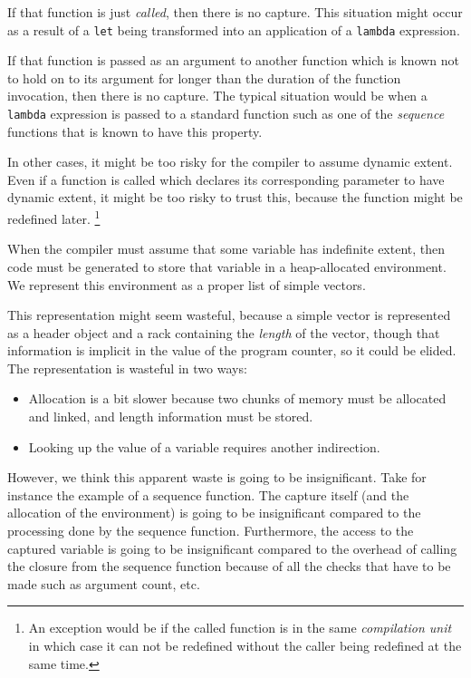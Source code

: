 If that function is just \emph{called}, then there is no capture.  This
situation might occur as a result of a \texttt{let} being transformed
into an application of a \texttt{lambda} expression.  

If that function is passed as an argument to another function which is
known not to hold on to its argument for longer than the duration of
the function invocation, then there is no capture.  The typical
situation would be when a \texttt{lambda} expression is passed to a
standard \commonlisp{} function such as one of the \emph{sequence} functions
that is known to have this property.  

In other cases, it might be too risky for the compiler to assume
dynamic extent.  Even if a function is called which declares its
corresponding parameter to have dynamic extent, it might be too risky
to trust this, because the function might be redefined later.%
\footnote{An exception would be if the called function is in the same
  \emph{compilation unit} in which case it can not be redefined
  without the caller being redefined at the same time.}

When the compiler must assume that some variable has indefinite
extent, then code must be generated to store that variable in a
heap-allocated environment.  We represent this environment as a proper
\commonlisp{} list of simple vectors.  

This representation might seem wasteful, because a simple vector is
represented as a header object and a rack containing the
\emph{length} of the vector, though that information is implicit in
the value of the program counter, so it could be elided.  The
representation is wasteful in two ways:

\begin{itemize}
\item Allocation is a bit slower because two chunks of memory must be
  allocated and linked, and length information must be stored. 
\item Looking up the value of a variable requires another
  indirection. 
\end{itemize}

However, we think this apparent waste is going to be insignificant.
Take for instance the example of a sequence function.  The capture
itself (and the allocation of the environment) is going to be
insignificant compared to the processing done by the sequence
function.  Furthermore, the access to the captured variable is going
to be insignificant compared to the overhead of calling the closure
from the sequence function because of all the checks that have to be
made such as argument count, etc.  

